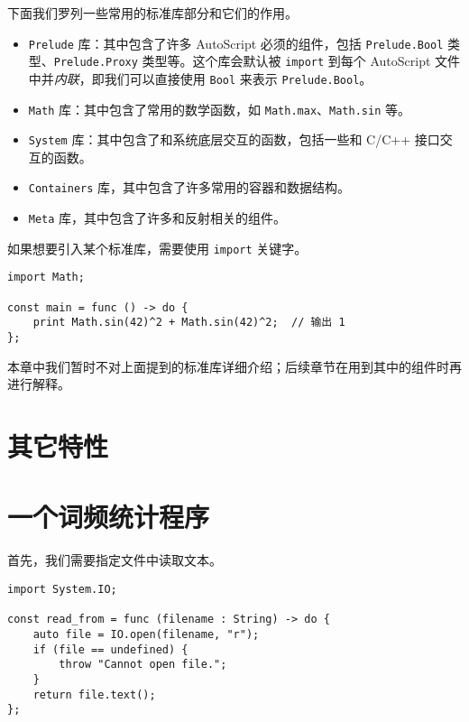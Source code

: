 下面我们罗列一些常用的标准库部分和它们的作用。

\begin{itemize}
    \item \lstinline!Prelude! 库：其中包含了许多 AutoScript 必须的组件，包括 \lstinline!Prelude.Bool! 类型、\lstinline!Prelude.Proxy! 类型等。这个库会默认被 \lstinline!import! 到每个 AutoScript 文件中并\emph{内联}，即我们可以直接使用 \lstinline!Bool! 来表示 \lstinline!Prelude.Bool!。

    \item \lstinline!Math! 库：其中包含了常用的数学函数，如 \lstinline!Math.max!、\lstinline!Math.sin! 等。

    \item \lstinline!System! 库：其中包含了和系统底层交互的函数，包括一些和 C/C++ 接口交互的函数。

    \item \lstinline!Containers! 库，其中包含了许多常用的容器和数据结构。

    \item \lstinline!Meta! 库，其中包含了许多和反射相关的组件。
\end{itemize}

如果想要引入某个标准库，需要使用 \lstinline!import! 关键字。

\begin{lstlisting}
import Math;

const main = func () -> do {
    print Math.sin(42)^2 + Math.sin(42)^2;  // 输出 1
};
\end{lstlisting}

本章中我们暂时不对上面提到的标准库详细介绍；后续章节在用到其中的组件时再进行解释。

\section{其它特性}



\section{一个词频统计程序}

首先，我们需要指定文件中读取文本。

\begin{lstlisting}
import System.IO;

const read_from = func (filename : String) -> do {
    auto file = IO.open(filename, "r");
    if (file == undefined) {
        throw "Cannot open file.";
    }
    return file.text();
};
\end{lstlisting}

